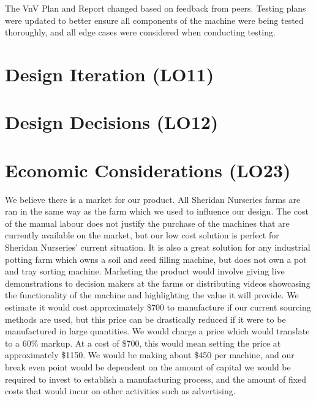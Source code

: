 \documentclass{article}
\begin{document}
The VnV Plan and Report changed based on feedback from peers. Testing plans were updated to better ensure all 
components of the machine were being tested thoroughly, and all edge cases were considered when conducting testing.
\section{Design Iteration (LO11)}


\section{Design Decisions (LO12)}


\section{Economic Considerations (LO23)}


We believe there is a market for our product. All Sheridan Nurseries farms are ran in the same way 
as the farm which we used to influence our design. The cost of the manual labour does not justify the 
purchase of the machines that are currently available on the market, but our low cost solution is perfect 
for Sheridan Nurseries' current situation. It is also a great solution for any industrial potting farm which 
owns a soil and seed filling machine, but does not own a pot and tray sorting machine. Marketing the product 
would involve giving live demonstrations to decision makers at the farms or distributing videos showcasing the functionality 
of the machine and highlighting the value it will provide. We estimate it would cost approximately \$700 to manufacture 
if our current sourcing methods are used, but this price can be drastically reduced if it were to be manufactured in large 
quantities. We would charge a price which would translate to a 60\% markup. At a cost of \$700, this would mean setting the price 
at approximately \$1150. We would be making about \$450 per machine, and our break even point would be dependent on the amount of 
capital we would be required to invest to establish a manufacturing process, and the amount of fixed costs that would incur on other 
activities such as advertising.
\end{document}
